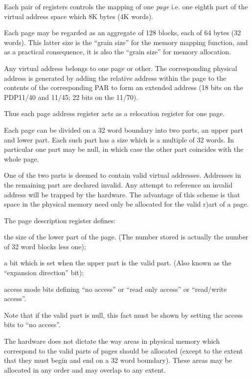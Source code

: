 Each pair of registers controls the
mapping of one {\it page} i.e. one eighth
part of the virtual address space which
8K bytes (4K words).


Each page may be regarded as an aggregate
of 128 blocks, each of 64 bytes
(32 words). This latter size is the
``grain size'' for the memory mapping
function, and as a practical consequence,
it is also the ``grain size'' for
memory allocation.

Any virtual address belongs to one page
or other. The corresponding physical
address is generated by adding the
relative address within the page to the
contents of the corresponding PAR to
form an extended address (18 bits on
the PDP11/40 and 11/45; 22 bits on the
11/70).

Thus each page address register acts as
a relocation register for one page.

Each page can be divided on a 32 word
boundary into two parts, an upper part
and lower part. Each such part has a
size which is a multiple of 32 words.
In particular one part may be null, in
which case the other part coincides
with the whole page.

One of the two parts is deemed to contain
valid virtual addresses. Addresses
in the remaining part are declared
invalid. Any attempt to reference an
invalid address will be trapped by the
hardware. The advantage of this scheme
is that space in the physical memory
need only be allocated for the valid
r)art of a page.



The page description register defines:

\bd
\item[(a)] the size of the lower part of
the page. (The number stored is
actually the number of 32 word
blocks less one);

\item[(b)] a bit which is set when the
upper part is the valid part.
(Also known as the ``expansion
direction'' bit);

\item[(c)] access mode bits defining ``no
access'' or ``read only access'' or
``read/write access''.
\ed

Note that if the valid part is null,
this fact must be shown by setting the
access bits to ``no access''.


The hardware does not dictate the way
areas in physical memory which
correspond to the valid parts of pages
should be allocated (except to the
extent that they must begin and end on
a 32 word boundary). These areas may be
allocated in any order and may overlap
to any extent.

